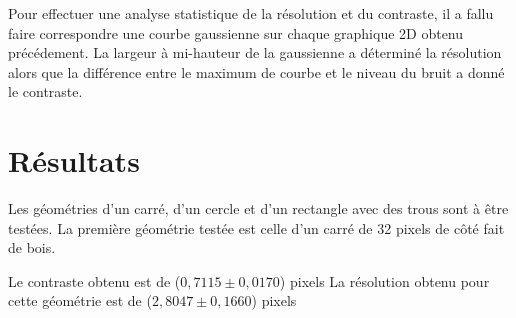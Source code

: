 \documentclass[conference]{IEEEtran}
\begin{document}
Pour effectuer une analyse statistique de la résolution et du contraste, il a fallu 
faire correspondre une courbe gaussienne sur chaque graphique 2D obtenu précédement. 
La largeur à mi-hauteur de la gaussienne a déterminé la résolution alors que la 
différence entre le maximum de courbe et le niveau du bruit a donné le contraste.







\section{Résultats}

Les géométries d'un carré, d'un cercle et d'un rectangle avec des trous sont à être 
testées. 
La première géométrie testée est celle d'un carré de 32 pixels de côté fait de bois. 

Le contraste obtenu est de ($0,7115 \pm 0,0170$) pixels
La résolution obtenu pour cette géométrie est de ($2,8047 \pm 0,1660$) pixels
\end{document}
